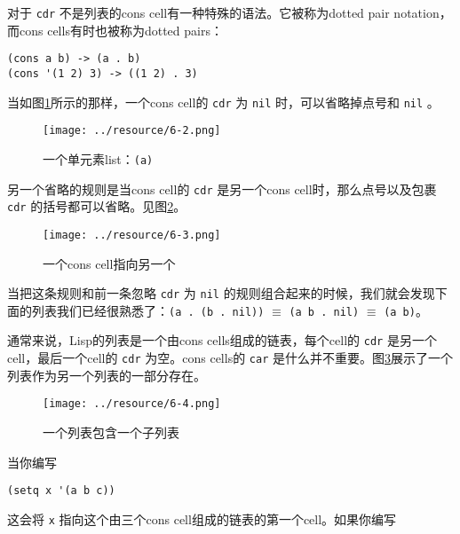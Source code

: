 对于 \texttt{cdr} 不是列表的cons cell有一种特殊的语法。它被称为dotted pair notation，而cons cells有时也被称为dotted pairs：

\begin{verbatim}
(cons a b) -> (a . b)
(cons '(1 2) 3) -> ((1 2) . 3)
\end{verbatim}

当如图\ref{figure:a-single-element-list-a}所示的那样，一个cons cell的 \texttt{cdr} 为 \texttt{nil} 时，可以省略掉点号和 \texttt{nil} 。

\begin{figure}[hbt!]
  \texttt{[image: ../resource/6-2.png]}
  \caption{一个单元素list：\texttt{(a)}}
  \label{figure:a-single-element-list-a}
\end{figure}

另一个省略的规则是当cons cell的 \texttt{cdr} 是另一个cons cell时，那么点号以及包裹 \texttt{cdr} 的括号都可以省略。见图\ref{figure:one-cons-cell-points-to-another}。

\begin{figure}[hbt!]
  \texttt{[image: ../resource/6-3.png]}
  \caption{一个cons cell指向另一个}
  \label{figure:one-cons-cell-points-to-another}
\end{figure}

当把这条规则和前一条忽略 \texttt{cdr} 为 \texttt{nil} 的规则组合起来的时候，我们就会发现下面的列表我们已经很熟悉了：\texttt{(a . (b . nil))} $\equiv$ \texttt{(a b . nil)} $\equiv$ \texttt{(a b)}。

通常来说，Lisp的列表是一个由cons cells组成的链表，每个cell的 \texttt{cdr} 是另一个cell，最后一个cell的 \texttt{cdr} 为空。cons cells的 \texttt{car} 是什么并不重要。图\ref{figure:a-list-containing-a-sublist}展示了一个列表作为另一个列表的一部分存在。

\begin{figure}[hbt!]
  \texttt{[image: ../resource/6-4.png]}
  \caption{一个列表包含一个子列表}
  \label{figure:a-list-containing-a-sublist}
\end{figure}

当你编写

\begin{verbatim}
(setq x '(a b c))
\end{verbatim}

这会将 \texttt{x} 指向这个由三个cons cell组成的链表的第一个cell。如果你编写

